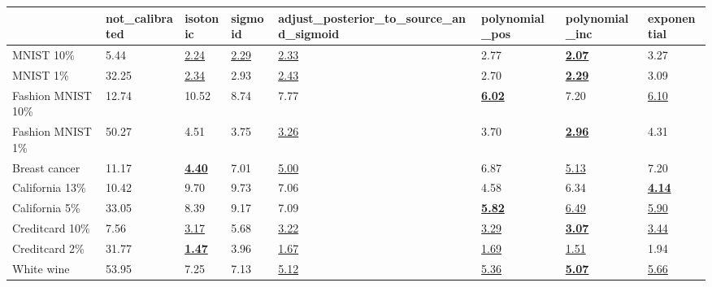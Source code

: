 \begin{tabular}{llllllll}
\toprule
 & not_calibrated & isotonic & sigmoid & adjust_posterior_to_source_and_sigmoid & polynomial_pos & polynomial_inc & exponential \\
\midrule
MNIST 10\% & 5.44 & \underline{2.24} & \underline{2.29} & \underline{2.33} & 2.77 & \underline{\textbf{2.07}} & 3.27 \\
MNIST 1\% & 32.25 & \underline{2.34} & 2.93 & \underline{2.43} & 2.70 & \underline{\textbf{2.29}} & 3.09 \\
Fashion MNIST 10\% & 12.74 & 10.52 & 8.74 & 7.77 & \underline{\textbf{6.02}} & 7.20 & \underline{6.10} \\
Fashion MNIST 1\% & 50.27 & 4.51 & 3.75 & \underline{3.26} & 3.70 & \underline{\textbf{2.96}} & 4.31 \\
Breast cancer & 11.17 & \underline{\textbf{4.40}} & 7.01 & \underline{5.00} & 6.87 & \underline{5.13} & 7.20 \\
California 13\% & 10.42 & 9.70 & 9.73 & 7.06 & 4.58 & 6.34 & \underline{\textbf{4.14}} \\
California 5\% & 33.05 & 8.39 & 9.17 & 7.09 & \underline{\textbf{5.82}} & \underline{6.49} & \underline{5.90} \\
Creditcard 10\% & 7.56 & \underline{3.17} & 5.68 & \underline{3.22} & \underline{3.29} & \underline{\textbf{3.07}} & \underline{3.44} \\
Creditcard 2\% & 31.77 & \underline{\textbf{1.47}} & 3.96 & \underline{1.67} & \underline{1.69} & \underline{1.51} & 1.94 \\
White wine & 53.95 & 7.25 & 7.13 & \underline{5.12} & \underline{5.36} & \underline{\textbf{5.07}} & \underline{5.66} \\
\bottomrule
\end{tabular}

